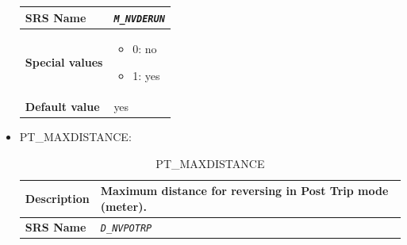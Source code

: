 \documentclass{template/openetcs}
\begin{document}
\begin{itemize}
\begin{longtable}{|l|l|}
				\hline
				
					\begin{minipage}[t]{0.22\linewidth} \textbf{SRS Name}	\end{minipage} 
				&	\begin{minipage}[t]{0.78\linewidth} \emph{\texttt{M\_NVDERUN}} \end{minipage} \\
				
				\hline
																																
					\begin{minipage}[t]{0.22\linewidth} \textbf{Special values}	\end{minipage} 
				&	\begin{minipage}[t]{0.78\linewidth} \begin{itemize} \item 0: no \item 1: yes \end{itemize} \end{minipage} \\
								
				\hline
										
					\begin{minipage}[t]{0.22\linewidth} \textbf{Default value}	\end{minipage} 
				&	\begin{minipage}[t]{0.78\linewidth} yes \end{minipage} \\
				
				\hline
				
			\end{longtable}
								
		\item PT\_MAXDISTANCE:
		
			\begin{longtable}{|l|l|}
				\caption{PT\_MAXDISTANCE}\\ 																							
				\hline
				
					\begin{minipage}[t]{0.22\linewidth} \textbf{Description}	\end{minipage} 
				&	\begin{minipage}[t]{0.78\linewidth} Maximum distance for reversing in Post Trip mode (meter). \end{minipage} \\
				
				\hline
				
					\begin{minipage}[t]{0.22\linewidth} \textbf{SRS Name}	\end{minipage} 
				&	\begin{minipage}[t]{0.78\linewidth} \emph{\texttt{D\_NVPOTRP}} \end{minipage} \\
				

\end{longtable}
\end{itemize}
\end{document}
